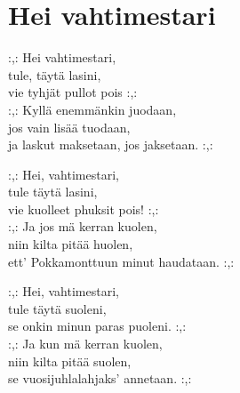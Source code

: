 \section{Hei vahtimestari}

:,: Hei vahtimestari,\\
tule, täytä lasini,\\
vie tyhjät pullot pois :,:\\
:,: Kyllä enemmänkin juodaan,\\
jos vain lisää tuodaan,\\
ja laskut maksetaan, jos jaksetaan. :,:


:,: Hei, vahtimestari,\\
tule täytä lasini,\\
vie kuolleet phuksit pois! :,:\\
:,: Ja jos mä kerran kuolen,\\
niin kilta pitää huolen,\\
ett’ Pokkamonttuun minut haudataan. :,:


:,: Hei, vahtimestari,\\
tule täytä suoleni,\\
se onkin minun paras puoleni. :,:\\
:,: Ja kun mä kerran kuolen,\\
niin kilta pitää suolen,\\
se vuosijuhlalahjaks’ annetaan. :,: